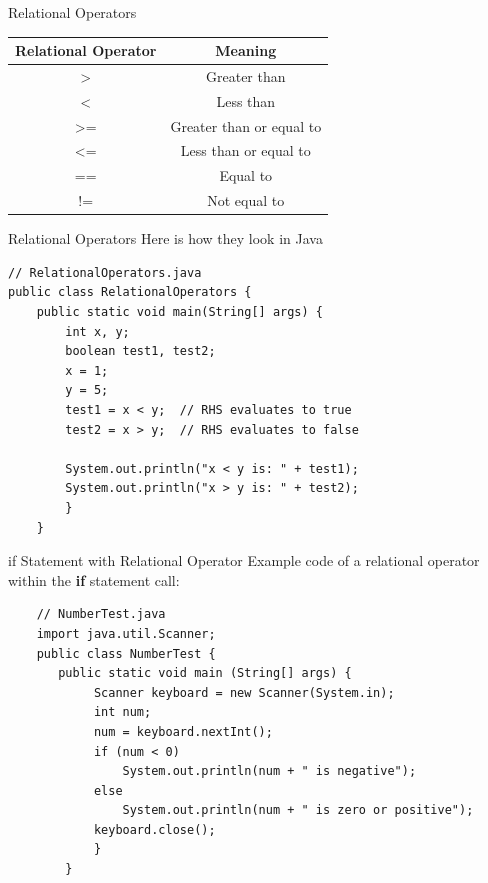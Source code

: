 \documentclass[11pt]{beamer}
\begin{document}
\begin{frame}{Relational Operators}
    \begin{table}[]
    \begin{tabular}{|c|c|}
    \hline
    Relational Operator & Meaning                  \\ \hline
    \textgreater{}      & Greater than             \\ \hline
    \textless{}         & Less than                \\ \hline
    \textgreater{}=     & Greater than or equal to \\ \hline
    \textless{}=        & Less than or equal to    \\ \hline
    ==                  & Equal to                 \\ \hline
    !=                  & Not equal to             \\ \hline
    \end{tabular}
    \end{table}
\end{frame}

\begin{frame}[fragile]{Relational Operators}
    Here is how they look in Java
    \begin{lstlisting}
// RelationalOperators.java
public class RelationalOperators {
    public static void main(String[] args) {
        int x, y;
        boolean test1, test2;
        x = 1;
        y = 5;
        test1 = x < y;  // RHS evaluates to true
        test2 = x > y;  // RHS evaluates to false

        System.out.println("x < y is: " + test1);
        System.out.println("x > y is: " + test2);
        }
    }
    \end{lstlisting}
\end{frame}

\begin{frame}[fragile]{if Statement with Relational Operator}
    Example code of a relational operator within the \textbf{if} statement call:
    \begin{lstlisting}
    // NumberTest.java
    import java.util.Scanner;
    public class NumberTest {
	   public static void main (String[] args) {
    		Scanner keyboard = new Scanner(System.in);
    		int num;
    		num = keyboard.nextInt();
    		if (num < 0)
    			System.out.println(num + " is negative");
    		else
    			System.out.println(num + " is zero or positive");
    		keyboard.close();
    		}
        }
    \end{lstlisting}
\end{frame}
\end{document}
